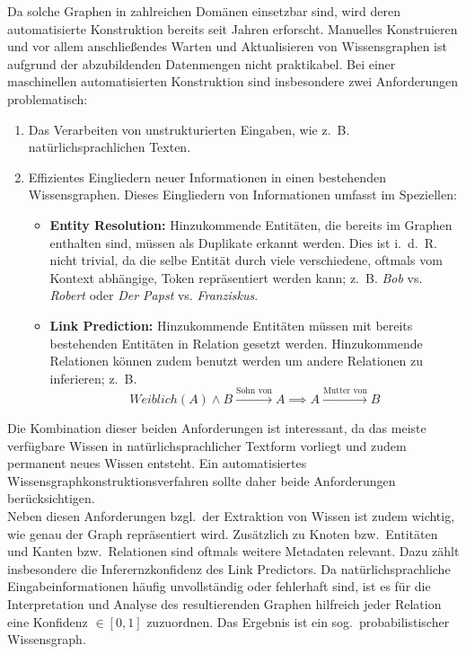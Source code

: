 \documentclass[11pt, a4paper]{scrreprt}
\begin{document}
Da solche Graphen in zahlreichen Domänen einsetzbar sind, wird deren automatisierte Konstruktion bereits seit Jahren erforscht.
Manuelles Konstruieren und vor allem anschließendes Warten und Aktualisieren von Wissensgraphen ist aufgrund der abzubildenden Datenmengen nicht praktikabel.
Bei einer maschinellen automatisierten Konstruktion sind insbesondere zwei Anforderungen problematisch:
\begin{enumerate}
	\item Das Verarbeiten von unstrukturierten Eingaben, wie z.~B. natürlichsprachlichen Texten.
	\item Effizientes Eingliedern neuer Informationen in einen bestehenden Wissensgraphen.
		Dieses Eingliedern von Informationen umfasst im Speziellen:
		\begin{itemize}
			\item \textbf{Entity Resolution:}
				Hinzukommende Entitäten, die bereits im Graphen enthalten sind, müssen als Duplikate erkannt werden.
				Dies ist i.~d.~R. nicht trivial, da die selbe Entität durch viele verschiedene, oftmals vom Kontext abhängige, Token repräsentiert werden kann;
				z.~B. \textit{Bob} vs. \textit{Robert} oder \textit{Der Papst} vs. \textit{Franziskus}.
			\item \textbf{Link Prediction:}
				Hinzukommende Entitäten müssen mit bereits bestehenden Entitäten in Relation gesetzt werden.
				Hinzukommende Relationen können zudem benutzt werden um andere Relationen zu inferieren;
				z.~B. $$Weiblich(A) \land B \xrightarrow{\text{Sohn~von}} A \implies A \xrightarrow{\text{Mutter~von}} B$$
		\end{itemize}
\end{enumerate}

Die Kombination dieser beiden Anforderungen ist interessant, da das meiste verfügbare Wissen in natürlichsprachlicher Textform vorliegt und zudem permanent neues Wissen entsteht.
Ein automatisiertes Wissensgraphkonstruktionsverfahren sollte daher beide Anforderungen berücksichtigen.\\

Neben diesen Anforderungen bzgl.\ der Extraktion von Wissen ist zudem wichtig, wie genau der Graph repräsentiert wird.
Zusätzlich zu Knoten bzw.\ Entitäten und Kanten bzw.\ Relationen sind oftmals weitere Metadaten relevant.
Dazu zählt insbesondere die Inferernzkonfidenz des Link Predictors.
Da natürlichsprachliche Eingabeinformationen häufig unvollständig oder fehlerhaft sind, ist es für die Interpretation und Analyse des resultierenden Graphen hilfreich jeder Relation eine Konfidenz $\in [0, 1]$ zuzuordnen.
Das Ergebnis ist ein sog.\ probabilistischer Wissensgraph.
\end{document}
